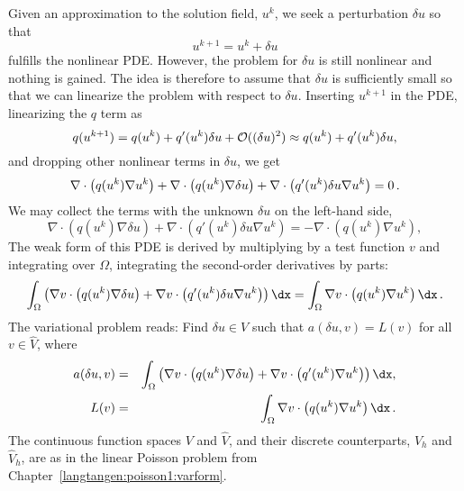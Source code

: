 Given an approximation to the solution field, $u^k$, we seek a
perturbation $\delta u$ so that
\begin{equation}
u^{k+1} = u^k + \delta u
\end{equation}
fulfills the nonlinear PDE. 
However, the problem for $\delta u$ is still nonlinear and nothing is
gained. The idea is therefore to assume that $\delta u$ is sufficiently
small so that we can linearize the problem with respect to $\delta u$.
Inserting $u^{k+1}$ in the PDE,
linearizing the $q$ term as
\begin{equation}
q(u^{k+1}) = q(u^k) + q'(u^k)\delta u + {\cal O}((\delta u)^2)
\approx q(u^k) + q'(u^k)\delta u,
\end{equation}
and dropping other nonlinear terms in $\delta u$,
we get
\[
\nabla\cdot\left( q(u^k)\nabla u^k\right) +
\nabla\cdot\left( q(u^k)\nabla\delta u\right) +
\nabla\cdot\left( q'(u^k)\delta u\nabla u^k\right) = 0\thinspace .
\]
We may collect the terms with the unknown $\delta u$ on the left-hand side,
\begin{equation}
\nabla\cdot\left( q(u^k)\nabla\delta u\right) +
\nabla\cdot\left( q'(u^k)\delta u\nabla u^k\right) = 
-\nabla\cdot\left( q(u^k)\nabla u^k\right),
\end{equation}
The weak form of this PDE is derived by multiplying by a test function $v$
and integrating over $\Omega$, integrating the second-order derivatives
by parts:
\begin{equation}
\int_\Omega \left( 
\nabla v\cdot \left( q(u^k)\nabla\delta u\right)
+ \nabla v\cdot \left( q'(u^k)\delta u\nabla u^k\right)\right)\dx
= \int_\Omega\nabla v\cdot\left( q(u^k)\nabla u^k\right)\dx\langtangenep
\end{equation}
The variational problem reads: Find $\delta u\in V$ such that
$a(\delta u,v) = L(v)$ for all $v\in \hat V$, where
\begin{eqnarray}
a(\delta u,v) &=& 
\int_\Omega \left( 
\nabla v\cdot \left( q(u^k)\nabla\delta u\right)
+ \nabla v\cdot \left( q'(u^k)\nabla u^k\right)\right)\dx,\\
\label{langtangen:nonlinear:poisson:pdelevel:eq1}
L(v) &=& 
\int_\Omega\nabla v\cdot\left( q(u^k)\nabla u^k\right)\dx\langtangenep
\label{langtangen:nonlinear:poisson:pdelevel:eq2}
\end{eqnarray}
The continuous function spaces $V$ and $\hat V$, and their discrete
counterparts, $V_h$ and $\hat V_h$, are as in the
linear Poisson problem from Chapter~\ref{langtangen:poisson1:varform}.

